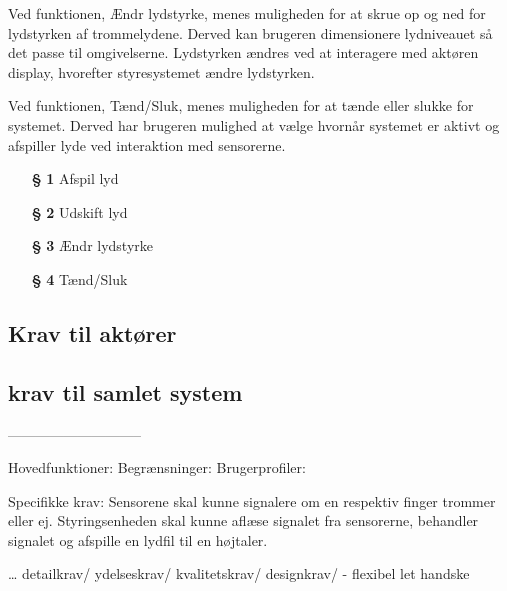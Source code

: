 Ved funktionen, Ændr lydstyrke, menes muligheden for at skrue op og ned for lydstyrken af trommelydene. Derved kan brugeren dimensionere lydniveauet så det passe til omgivelserne. Lydstyrken ændres ved at interagere med aktøren display, hvorefter styresystemet ændre lydstyrken.

Ved funktionen, Tænd/Sluk, menes muligheden for at tænde eller slukke for systemet. Derved har brugeren mulighed at vælge hvornår systemet er aktivt og afspiller lyde ved interaktion med sensorerne.

\begin{enumerate}
\item[\textbf{§}] \textbf{1} Afspil lyd 
\item[\textbf{§}] \textbf{2} Udskift lyd
\item[\textbf{§}] \textbf{3} Ændr lydstyrke
\item[\textbf{§}] \textbf{4} Tænd/Sluk
\end{enumerate}
\subsection{Krav til aktører}
\subsection{krav til samlet system}


 


-----------------------------

Hovedfunktioner: 
Begrænsninger:
Brugerprofiler:

Specifikke krav: 
Sensorene skal kunne signalere om en respektiv finger trommer eller ej. 
Styringsenheden skal kunne aflæse signalet fra sensorerne, behandler signalet og afspille en lydfil til en højtaler.

… detailkrav/
ydelseskrav/
kvalitetskrav/
designkrav/ - flexibel let handske      

 
